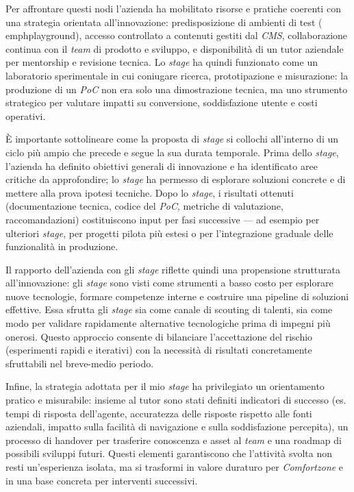 Per affrontare questi nodi l'azienda ha mobilitato risorse e pratiche coerenti con una strategia orientata all'innovazione: predisposizione di ambienti di test (\\emph{playground}), 
accesso controllato a contenuti gestiti dal \emph{CMS}, collaborazione continua con il \emph{team} di prodotto e sviluppo, e disponibilità di un tutor aziendale per mentorship e revisione tecnica. 
Lo \emph{stage} ha quindi funzionato come un laboratorio sperimentale in cui coniugare ricerca, prototipazione e misurazione: la produzione di un \emph{PoC} non era solo una dimostrazione tecnica, 
ma uno strumento strategico per valutare impatti su conversione, soddisfazione utente e costi operativi.

È importante sottolineare come la proposta di \emph{stage} si collochi all'interno di un ciclo più ampio che precede e segue la sua durata temporale. Prima dello \emph{stage}, 
l'azienda ha definito obiettivi generali di innovazione e ha identificato aree critiche da approfondire; lo \emph{stage} ha permesso di esplorare soluzioni concrete e di mettere 
alla prova ipotesi tecniche. Dopo lo \emph{stage}, i risultati ottenuti (documentazione tecnica, codice del \emph{PoC}, metriche di valutazione, raccomandazioni) 
costituiscono input per fasi successive — ad esempio per ulteriori \emph{stage}, per progetti pilota più estesi o per l'integrazione graduale delle funzionalità in produzione.

Il rapporto dell'azienda con gli \emph{stage} riflette quindi una propensione strutturata all'innovazione: gli \emph{stage} sono visti come strumenti a basso costo per esplorare nuove tecnologie, 
formare competenze interne e costruire una pipeline di soluzioni effettive. Essa sfrutta gli \emph{stage} sia come canale di scouting di talenti, sia come modo 
per validare rapidamente alternative tecnologiche prima di impegni più onerosi. Questo approccio consente di bilanciare l'accettazione del rischio (esperimenti rapidi e iterativi) 
con la necessità di risultati concretamente sfruttabili nel breve-medio periodo.

Infine, la strategia adottata per il mio \emph{stage} ha privilegiato un orientamento pratico e misurabile: insieme al tutor sono stati definiti indicatori di successo 
(es. tempi di risposta dell'agente, accuratezza delle risposte rispetto alle fonti aziendali, impatto sulla facilità di navigazione e sulla soddisfazione percepita), 
un processo di handover per trasferire conoscenza e asset al \emph{team} e una roadmap di possibili sviluppi futuri. Questi elementi garantiscono che l'attività svolta non resti 
un'esperienza isolata, ma si trasformi in valore duraturo per \emph{Comfortzone} e in una base concreta per interventi successivi.






